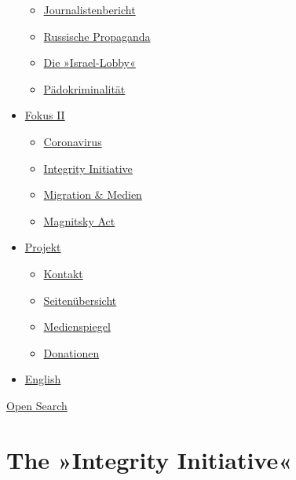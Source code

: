 \begin{itemize}
  \begin{itemize}
  \tightlist
  \item
    \href{https://swprs.org/bericht-eines-journalisten/}{Journalistenbericht}
  \item
    \href{https://swprs.org/russische-propaganda/}{Russische Propaganda}
  \item
    \href{https://swprs.org/die-israel-lobby-fakten-und-mythen/}{Die
    »Israel-Lobby«}
  \item
    \href{https://swprs.org/geopolitik-und-paedokriminalitaet/}{Pädokriminalität}
  \end{itemize}
\item
  \href{https://swprs.org/migration-und-medien/}{Fokus II}

  \begin{itemize}
  \tightlist
  \item
    \href{https://swprs.org/covid-19-hinweis-ii/}{Coronavirus}
  \item
    \href{https://swprs.org/die-integrity-initiative/}{Integrity
    Initiative}
  \item
    \href{https://swprs.org/migration-und-medien/}{Migration \& Medien}
  \item
    \href{https://swprs.org/der-fall-magnitsky/}{Magnitsky Act}
  \end{itemize}
\item
  \href{https://swprs.org/kontakt/}{Projekt}

  \begin{itemize}
  \tightlist
  \item
    \href{https://swprs.org/kontakt/}{Kontakt}
  \item
    \href{https://swprs.org/uebersicht/}{Seitenübersicht}
  \item
    \href{https://swprs.org/medienspiegel/}{Medienspiegel}
  \item
    \href{https://swprs.org/donationen/}{Donationen}
  \end{itemize}
\item
  \href{https://swprs.org/contact/}{English}
\end{itemize}

\protect\hyperlink{}{Open Search}

\hypertarget{the-integrity-initiative}{%
\section{The »Integrity Initiative«}\label{the-integrity-initiative}}

